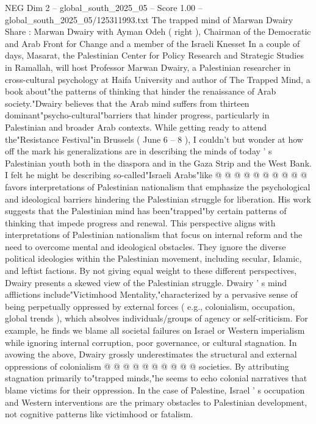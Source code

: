 \begin{textsample}{NEG Dim 2 – global\_south\_2025\_05 – Score 1.00 – global\_south\_2025\_05/125311993.txt}  \label{ex:f2_neg_399}
The trapped mind of Marwan Dwairy Share : Marwan Dwairy with Ayman Odeh ( right ), Chairman of the Democratic and Arab Front for Change and a member of the Israeli Knesset In a couple of days, Masarat, the Palestinian Center for Policy Research and Strategic Studies in Ramallah, will host Professor Marwan Dwairy, a Palestinian researcher in cross-cultural psychology at Haifa University and author of The Trapped Mind, a book about"the patterns of thinking that hinder the renaissance of Arab society."Dwairy believes that the Arab mind suffers from thirteen dominant"psycho-cultural"barriers that hinder progress, particularly in Palestinian and broader Arab contexts.
While getting ready to attend the"Resistance Festival"in Brussels ( June 6 -- 8 ), I couldn't but wonder at how off the mark his generalizations are in describing the minds of today ' s Palestinian youth both in the diaspora and in the Gaza Strip and the West Bank.
I felt he might be describing so-called"Israeli Arabs"like @ @ @ @ @ @ @ @ @ @ favors interpretations of Palestinian nationalism that emphasize the psychological and ideological barriers hindering the Palestinian struggle for liberation.
His work suggests that the Palestinian mind has been"trapped"by certain patterns of thinking that impede progress and renewal.
This perspective aligns with interpretations of Palestinian nationalism that focus on internal reform and the need to overcome mental and ideological obstacles.
They ignore the diverse political ideologies within the Palestinian movement, including secular, Islamic, and leftist factions.
By not giving equal weight to these different perspectives, Dwairy presents a skewed view of the Palestinian struggle.
Dwairy ' s mind afflictions include"Victimhood Mentality,"characterized by a pervasive sense of being perpetually oppressed by external forces ( e.g., colonialism, occupation, global trends ), which absolves individuals/groups of agency or self-criticism.
For example, he finds we blame all societal failures on Israel or Western imperialism while ignoring internal corruption, poor governance, or cultural stagnation.
In avowing the above, Dwairy grossly underestimates the structural and external oppressions of colonialism @ @ @ @ @ @ @ @ @ @ societies.
By attributing stagnation primarily to"trapped minds,"he seems to echo colonial narratives that blame victims for their oppression.
In the case of Palestine, Israel ' s occupation and Western interventions are the primary obstacles to Palestinian development, not cognitive patterns like victimhood or fatalism.

\end{textsample}
